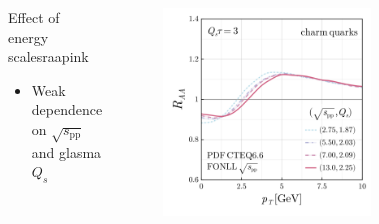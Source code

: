 \documentclass[aspectratio=169,11pt,usenames,dvipsnames]{beamer}
\begin{document}
\begin{frame}
\begin{center}
\begin{columns}[onlytextwidth,t]
\begin{figure}
            \end{figure}
            \begin{center}
                \begin{custombox}{\normalsize Effect of energy scales}{raapink}
                    \small
                    \begin{varwidth}{0.95\textwidth}
                    \begin{itemize}
                        \itemsep0em
                        \footnotesize
                        \item Weak dependence on $\sqrt{s_\mathrm{pp}}$ and glasma $Q_s$
                    \end{itemize}
                    \end{varwidth}
                \end{custombox}
            \end{center}
            \vspace{-10pt}
            \vspace{-7pt}
            \begin{figure}
                \centering
                \includegraphics[width=0.83\columnwidth]{images/clean_raa_tau_dep_charm_quark_Qs_fonll_energy_dep_qsenergymap_v3.png}
            \end{figure}
        \end{columns}    
    \end{center}
\end{frame}
\end{document}
